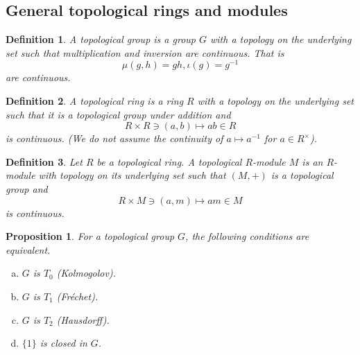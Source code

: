 \documentclass[8pt]{article}
\numberwithin{equation}{section}
\newtheorem{proposition}{Proposition}[subsection]
\newtheorem{definition}{Definition}[subsection]
\begin{document}
\subsection{General topological rings and modules}
\begin{definition}
    \label{definition_11_1_1}
    A topological group is a group $G$ with a topology on the underlying set such that multiplication and inversion are continuous. That is 
    \begin{equation*}
        \mu(g,h)=gh,\iota(g) = g^{-1}
    \end{equation*}
    are continuous.
\end{definition}
\begin{definition}
    \label{definition_11_1_2}
    A topological ring is a ring $R$ with a topology on the underlying set such that it is a topological group under addition and 
    \begin{equation*}
        R\times R\ni(a,b)\mapsto ab\in R
    \end{equation*}
    is continuous. (We do not assume the continuity of $a\mapsto a^{-1}$ for $a\in R^\times$).
\end{definition}
\begin{definition}
    \label{definition_11_1_3}
    Let $R$ be a topological ring. A topological $R$-module $M$ is an $R$-module with topology on its underlying set such that $(M,+)$ is a topological group and 
    \begin{equation*}
        R\times M\ni (a,m)\mapsto am\in M
    \end{equation*}
    is continuous.
\end{definition}
\begin{proposition}
    \label{fact_11_1}
    For a topological group $G$, the following conditions are equivalent.
    \begin{enumerate}[a.]
        \item $G$ is $T_0$ (Kolmogolov).
        \item $G$ is $T_1$ (Fréchet).
        \item $G$ is $T_2$ (Hausdorff).
        \item $\{1\}$ is closed in $G$.
    \end{enumerate}
\end{proposition}
\end{document}
